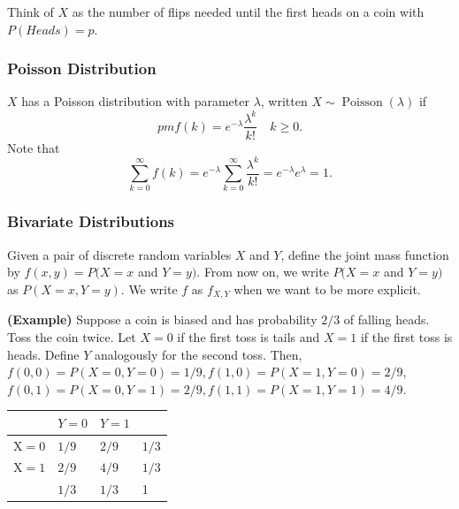 \documentclass[13pt]{article}
\theoremstyle{definition}
\theoremstyle{remark}
\newenvironment{remark}
  {\pushQED{\qed}\renewcommand{\qedsymbol}{$\triangle$}\remarkx}
  {\popQED\endremarkx}
\begin{document}
Think of $X$ as the number of flips needed until the first heads on a coin with $P(Heads)=p$.

\subsubsection{Poisson Distribution}
$X$ has a Poisson distribution with parameter $\lambda$, written $X \sim \operatorname{Poisson}(\lambda)$ if
$$
pmf(k)=e^{-\lambda} \frac{\lambda^{k}}{k !} \quad k \geq 0 .
$$
Note that
$$
\sum_{k=0}^{\infty} f(k)=e^{-\lambda} \sum_{k=0}^{\infty} \frac{\lambda^{k}}{k !}=e^{-\lambda} e^{\lambda}=1 .
$$

\subsubsection{Bivariate Distributions}
Given a pair of discrete random variables $X$ and $Y$, define the joint mass function by $f(x, y)=P(X=x$ and $Y=y)$. From now on, we write $P(X=x$ and $Y=y)$ as $P(X=x, Y=y)$. We write $f$ as $f_{X, Y}$ when we want to be more explicit.

\begin{remark}
    \textbf{(Example)} Suppose a coin is biased and has probability $2 / 3$ of falling heads. Toss the coin twice. Let $X=0$ if the first toss is tails and $X=1$ if the first toss is heads. Define $Y$ analogously for the second toss. Then, $f(0,0)=P(X=0, Y=0)=1 / 9, f(1,0)=P(X=1, Y=0)=2 / 9$, $f(0,1)=P(X=0, Y=1)=2 / 9, f(1,1)=P(X=1, Y=1)=4 / 9$.

\begin{center}
\begin{tabular}{l|ll|l}
 & $Y=0$ & $Y=1$ &  \\
\hline
$\mathrm{X}=0$ & $1 / 9$ & $2 / 9$ & $1 / 3$ \\
$\mathrm{X}=1$ & $2 / 9$ & $4 / 9$ & $1 / 3$ \\
\hline
 & $1 / 3$ & $1 / 3$ & 1 \\
\hline
\end{tabular}
\end{center}
\end{remark}
 
\end{document}
